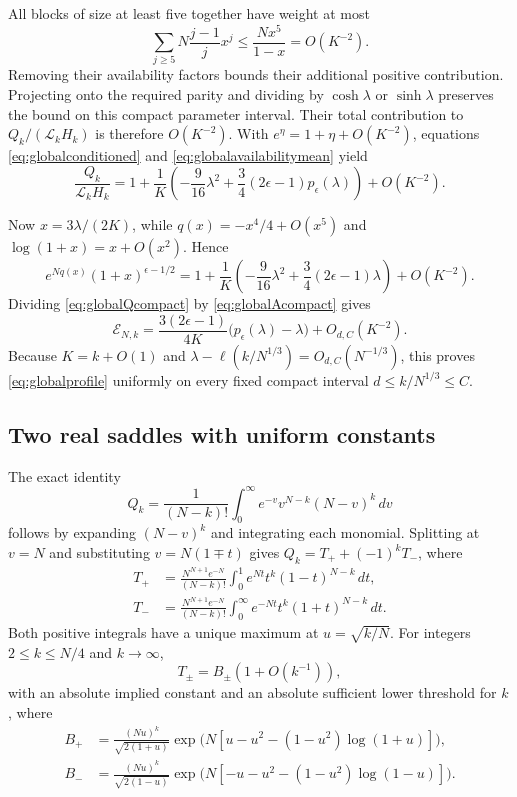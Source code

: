 \documentclass[11pt]{article}
\theoremstyle{definition}
\theoremstyle{remark}
\newcommand{\1}{\mathbf 1}
\begin{document}
All blocks of size at least five together have weight at most
\[
\sum_{j\ge5}N\frac{j-1}{j}x^j
\le\frac{Nx^5}{1-x}=O(K^{-2}).
\]
Removing their availability factors bounds their additional positive contribution. Projecting onto the required parity and dividing by $\cosh\lambda$ or $\sinh\lambda$ preserves the bound on this compact parameter interval. Their total contribution to $Q_k/(\mathcal L_kH_k)$ is therefore $O(K^{-2})$. With $e^\eta=1+\eta+O(K^{-2})$, equations \eqref{eq:globalconditioned} and \eqref{eq:globalavailabilitymean} yield
\begin{equation}\label{eq:globalQcompact}
\frac{Q_k}{\mathcal L_kH_k}
=1+\frac1K\left(-\frac9{16}\lambda^2
+\frac34(2\epsilon-1)p_\epsilon(\lambda)\right)+O(K^{-2}).
\end{equation}

Now $x=3\lambda/(2K)$, while $q(x)=-x^4/4+O(x^5)$ and $\log(1+x)=x+O(x^2)$. Hence
\begin{equation}\label{eq:globalAcompact}
e^{Nq(x)}(1+x)^{\epsilon-1/2}
=1+\frac1K\left(-\frac9{16}\lambda^2
+\frac34(2\epsilon-1)\lambda\right)+O(K^{-2}).
\end{equation}
Dividing \eqref{eq:globalQcompact} by \eqref{eq:globalAcompact} gives
\begin{equation}\label{eq:globalcompact}
\mathcal E_{N,k}
=\frac{3(2\epsilon-1)}{4K}
\bigl(p_\epsilon(\lambda)-\lambda\bigr)+O_{d,C}(K^{-2}).
\end{equation}
Because $K=k+O(1)$ and $\lambda-\ell(k/N^{1/3})=O_{d,C}(N^{-1/3})$, this proves \eqref{eq:globalprofile} uniformly on every fixed compact interval $d\le k/N^{1/3}\le C$.

\subsection{Two real saddles with uniform constants}

The exact identity
\begin{equation}\label{eq:globalrealintegral}
Q_k=\frac1{(N-k)!}\int_0^\infty e^{-v}v^{N-k}(N-v)^k\,dv
\end{equation}
follows by expanding $(N-v)^k$ and integrating each monomial. Splitting at $v=N$ and substituting $v=N(1\mp t)$ gives $Q_k=T_++(-1)^kT_-$, where
\begin{align*}
T_+&=\frac{N^{N+1}e^{-N}}{(N-k)!}
\int_0^1e^{Nt}t^k(1-t)^{N-k}\,dt,\\
T_-&=\frac{N^{N+1}e^{-N}}{(N-k)!}
\int_0^\infty e^{-Nt}t^k(1+t)^{N-k}\,dt.
\end{align*}
Both positive integrals have a unique maximum at $u=\sqrt{k/N}$. For integers $2\le k\le N/4$ and $k\to\infty$,
\begin{equation}\label{eq:globalrealLaplace}
T_\pm=B_\pm(1+O(k^{-1})),
\end{equation}
with an absolute implied constant and an absolute sufficient lower threshold for $k$, where
\begin{align}
B_+&=\frac{(Nu)^k}{\sqrt{2(1+u)}}
\exp\bigl(N[u-u^2-(1-u^2)\log(1+u)]\bigr),\label{eq:globalBplus}\\
B_-&=\frac{(Nu)^k}{\sqrt{2(1-u)}}
\exp\bigl(N[-u-u^2-(1-u^2)\log(1-u)]\bigr).\label{eq:globalBminus}
\end{align}
\end{document}
